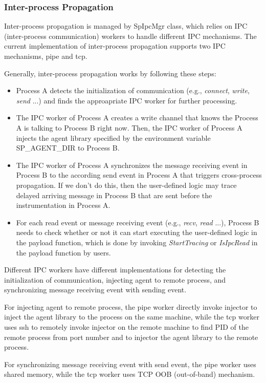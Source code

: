 \subsubsection{Inter-process Propagation}
Inter-process propagation is managed by SpIpcMgr class, which relies on IPC
(inter-process communication) workers to handle different IPC mechanisms.  The
current implementation of inter-process propagation supports two IPC mechanisms,
pipe and tcp.

Generally, inter-process propagation works by following these steps:
\begin{itemize}
\item Process A detects the initialization of communication (e.g., {\em
    connect}, {\em write}, {\em send} ...) and finds the approapriate IPC worker
  for further processing.
\item The IPC worker of Process A creates a write channel that knows the Process
  A is talking to Process B right now. Then, the IPC worker of Process A injects
  the agent library specified by the environment variable SP\_AGENT\_DIR to
  Process B.
\item The IPC worker of Process A synchronizes the message receiving event in
  Process B to the according send event in Process A that triggers cross-process
  propagation. If we don't do this, then the user-defined logic may trace
  delayed arriving message in Process B that are sent before the instrumentation
  in Process A.
\item For each read event or message receiving event (e.g., {\em recv}, {\em
    read} ...), Process B needs to check whether or not it can start executing
  the user-defined logic in the payload function, which is done by invoking {\em
    StartTracing} or {\em IsIpcRead} in the payload function by users.
\end{itemize}

Different IPC workers have different implementations for detecting the
initialization of communication, injecting agent to remote process, and
synchronizing message receiving event with sending event.

For injecting agent to remote process, the pipe worker directly invoke injector
to inject the agent library to the process on the same machine, while the tcp
worker uses ssh to remotely invoke injector on the remote machine to find PID of
the remote process from port number and to injector the agent library to the
remote process.

For synchronizing message receiving event with send event, the pipe worker uses
shared memory, while the tcp worker uses TCP OOB (out-of-band) mechanism.

